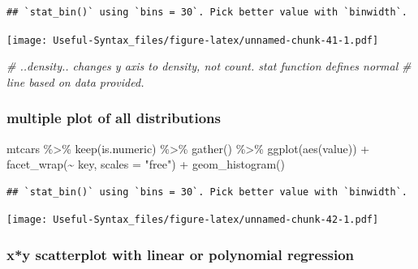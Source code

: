 \documentclass[
]{article}
\newenvironment{Shaded}{\begin{snugshade}}{\end{snugshade}}
\newcommand{\AttributeTok}[1]{\textcolor[rgb]{0.77,0.63,0.00}{#1}}
\newcommand{\CommentTok}[1]{\textcolor[rgb]{0.56,0.35,0.01}{\textit{#1}}}
\newcommand{\FunctionTok}[1]{\textcolor[rgb]{0.00,0.00,0.00}{#1}}
\newcommand{\NormalTok}[1]{#1}
\newcommand{\SpecialCharTok}[1]{\textcolor[rgb]{0.00,0.00,0.00}{#1}}
\newcommand{\StringTok}[1]{\textcolor[rgb]{0.31,0.60,0.02}{#1}}
\begin{document}
\begin{verbatim}
## `stat_bin()` using `bins = 30`. Pick better value with `binwidth`.
\end{verbatim}

\texttt{[image: Useful-Syntax\_files/figure-latex/unnamed-chunk-41-1.pdf]}

\begin{Shaded}
\begin{Highlighting}[]
\CommentTok{\# ..density.. changes y axis to density, not count. stat function defines normal}
\CommentTok{\# line based on data provided.}
\end{Highlighting}
\end{Shaded}

\hypertarget{multiple-plot-of-all-distributions}{%
\subsubsection{multiple plot of all distributions}\label{multiple-plot-of-all-distributions}}

\begin{Shaded}
\begin{Highlighting}[]
\NormalTok{mtcars }\SpecialCharTok{\%\textgreater{}\%} \FunctionTok{keep}\NormalTok{(is.numeric) }\SpecialCharTok{\%\textgreater{}\%} \FunctionTok{gather}\NormalTok{() }\SpecialCharTok{\%\textgreater{}\%} \FunctionTok{ggplot}\NormalTok{(}\FunctionTok{aes}\NormalTok{(value)) }\SpecialCharTok{+}
  \FunctionTok{facet\_wrap}\NormalTok{(}\SpecialCharTok{\textasciitilde{}}\NormalTok{ key, }\AttributeTok{scales =} \StringTok{"free"}\NormalTok{) }\SpecialCharTok{+} \FunctionTok{geom\_histogram}\NormalTok{()}
\end{Highlighting}
\end{Shaded}

\begin{verbatim}
## `stat_bin()` using `bins = 30`. Pick better value with `binwidth`.
\end{verbatim}

\texttt{[image: Useful-Syntax\_files/figure-latex/unnamed-chunk-42-1.pdf]}

\hypertarget{xy-scatterplot-with-linear-or-polynomial-regression}{%
\subsubsection{x*y scatterplot with linear or polynomial regression}\label{xy-scatterplot-with-linear-or-polynomial-regression}}
\end{document}
